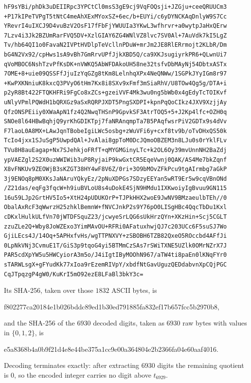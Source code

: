 \documentclass[11pt]{amsart}
\begin{document}
\begingroup\scriptsize
\begin{verbatim}
hF9sYBi/phDk3uDEIIRpc3YPCtCl0msS3gE9cj9VqFOQsji+JZGju+ceeQRUUCm3
+P17kIPeTVPgT5tNtC4meAhXExMYoxSZ+6ec/b+EUYi/c6yDYNCKAqDnlyW9S7Cc
YRevrI4uIXCJ9D4vuBzV2OsF17fFbFjYWUUIa3YKwL3wfhrvr+a0wytpJaHxQErw
7Lzv4i3Jk2BZUmRarFVQ5DV+XzlGIAY6ZG4WNlVZ8lvc7SV0Al+7AuVdk7kI5LgZ
Tv/hb64QI1o0FavaN2IVPtHVDlpTeVcllnPDuW+mrJm2JE8RlERrmojt2KLbR/Dm
bG4N2Vx92/cpHws1sA9vBh7GmRrvUPfJjkXBD5Q/ca9XKJsugiyrkPR6+QLwnUi7
qVoMBOC6NshTzvPfKsDK+nVWKQ5AbWFDAkoUH58ne32tsfvDbMAyNj54DbtxASTx
7OME+8+uie09QSSFfJjuIzYqGZg8tKm8LelnhqXPx4NeQNWw/1SGPkJYyIGm8r97
+KwPXKNniuK8kxcQ3PVyO6tHm7Kx8i8SXv9xFmf3mSiaRhV/U8TOw4Qg5g/DTA+i
p2yR8Bt422FTQKHFRi9FgCo8xZCs+gzeiVVF4Mk3wu0ng5bWb0x4gEdyTcTOIKvf
uNlyVPmlPQWdH1bQRXGz9aSxRQRPJXDT5PngSXDPI+kpnPqQoCIkz4JXV9XzjjAy
QfzONSPEiiy0XWaApN1fz4Q2NwqTHSnP9GpvkSF3AtrTOQ5+5+J2Kp4lfc+OZH0q
SNOe8l64HBwBqhjQ9yrKhGDIKTpj7faNRAnqmpTa7B5PAqfwsrPiV2GDTx9s4dVv
F7laoL0A8MX+LAwJqnTBobeIgiLWc5osbg+zWuVFi6y+cxf8tv9b/oTvDHxQS50k
TcIo4jxx1SJuSgP5UwpdQAl+JvAlai8gpToM0DcJQmoOBZEM3n8LJu0s0rYklFLv
TVu8H8auEagap+Nx7SJehkjoFRfT+qMYGMGinyLTc+k2OL6Oy39mvUnnNH2BaZdj
ypVAEZgl2S2X0uzWWIWib3uP8RyjaiP9kwGxtCR5EqeVwnj0QAK/AS4Me7bkZqnf
X8vFNKUv9ZEOWjB3sKZGT38HY4wF8V6Z/0ri+3O9bMOvZFkPcu9tgAIrmbg7aGkP
3j9ENOq8pM0XKsJaNAruYQkyEz/2pNuXDPGs7SDzyEEYan5wRT9Er5w9cqVBnONd
/Z21das/eqFg3fqcW+h9iuBVLoU8s4uDokE4SjN9HMdu1IXKwoiyIgBvuu9GN115
16u59LJp2GrtHV5Io5+XtH24pUDUKOrP+TJPkHHX2woE9JwNV9BMzaeulbTEh//0
ObalAxRcF3qWwrzH25zhklBemnW+fNVCJnkP2s9Y76pO0LISgHBc4QqcTbDu1Kxl
cDKxlHulkULfVn70jWTDFSquZ23/jcwyeSrLQG6sUkHrzQYn+XKzHin+Scj5CGLT
zzuZLe2Q+Wby8JoWZExo3YimMAvOU+RFRi0AFatuxhwjQJ7c203UCc6F5suSJ7Wo
GjiLEcs4J/14Oq+5APHxfvHs/wgTTPNXVY+zSBOBH6TZB82QxeO5ROccbd4AFfJi
0LpNkVNj3CvmuE1T/GiS3p9tqoG4yi5BTMmCzSAs7rSWiTXNE5UZlk0OMrNZrX7J
PAR5cdXpYW5u5HWCyiorA3m5o/J4iIgtIByMOOhN967/aTW4ti8paEn0lKNqFYr0
sTARWLsgX+gFYudKk77xIoa9rEzemRIVpY/xbdfNtGavUguzQEDdabvnXpCQjPGC
CqJTpqzgP4gW0/KuKrI5mO92ezE8LFaBl3bkY3c=
\end{verbatim}
\endgroup

\noindent Its SHA-256, taken over those $1832$ ASCII bytes, is
\begin{center}\ttfamily\small
f802277ca20184e1b026bddc89ed1b30ed791885fa832ef17b657fcc5b2970b8,
\end{center}
and the SHA-256 of the $6930$ decoded digits, taken as $6930$ raw bytes with
values in $\{0,1,2\}$, is
\begin{center}\ttfamily\small
e5a8368b4a0b9f21d4e8e44be375a1cc9e00a364804e2b2366fa04e60aaf4016.
\end{center}
Decoding terminates exactly: after extracting $6930$ digits the remaining
quotient is $0$, so the encoded integer carries no digit above $t_{6929}$.
\end{document}
